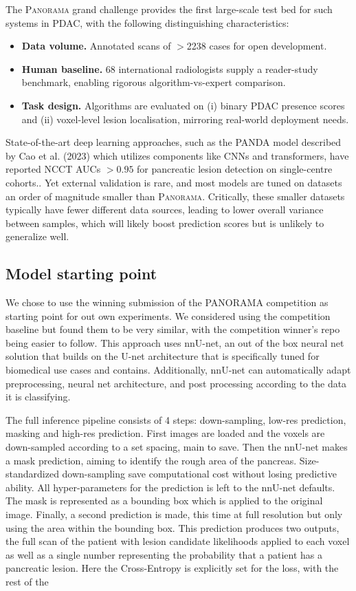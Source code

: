 \documentclass[conference]{IEEEtran}
\begin{document}
The \textsc{Panorama} grand challenge provides the first large-scale test bed for such systems in PDAC, with the following distinguishing characteristics:  
\begin{itemize}[leftmargin=*]
  \item \textbf{Data volume.} Annotated scans of $>$2238 cases for open development.
  \item \textbf{Human baseline.} 68 international radiologists supply a reader-study benchmark, enabling rigorous algorithm-vs-expert comparison.
  \item \textbf{Task design.} Algorithms are evaluated on (i) binary PDAC presence scores and (ii) voxel-level lesion localisation, mirroring real-world deployment needs.
\end{itemize}

State-of-the-art deep learning approaches, such as the PANDA model described by Cao et al. (2023) which utilizes components like CNNs and transformers, have reported NCCT AUCs $>0.95$ for pancreatic lesion detection on single-centre cohorts.\cite{b9}. Yet external validation is rare, and most models are tuned on datasets an order of magnitude smaller than \textsc{Panorama}. Critically, these smaller datasets typically have fewer different data sources, leading to lower overall variance between samples, which will likely boost prediction scores but is unlikely to generalize well.

\subsection{Model starting point}
We chose to use the winning submission of the PANORAMA competition as starting point for out own experiments. We considered using the competition baseline but found them to be very similar, with the competition winner's repo being easier to follow. This approach uses nnU-net, \cite{b1} an out of the box neural net solution that builds on the U-net architecture that is specifically tuned for biomedical use cases and contains. Additionally, nnU-net can automatically adapt preprocessing, neural net architecture, and post processing according to the data it is classifying.

The full inference pipeline consists of 4 steps: down-sampling, low-res prediction, masking and high-res prediction. First images are loaded and the voxels are down-sampled according to a set spacing, main to save. Then the nnU-net makes a mask prediction, aiming to identify the rough area of the pancreas. Size-standardized down-sampling save computational cost without losing predictive ability. All hyper-parameters for the prediction is left to the nnU-net defaults. The mask is represented as a bounding box which is applied to the original image. Finally, a second prediction is made, this time at full resolution but only using the area within the bounding box. This prediction produces two outputs, the full scan of the patient with lesion candidate likelihoods applied to each voxel as well as a single number representing the probability that a patient has a pancreatic lesion. Here the Cross-Entropy is explicitly set for the loss, with the rest of the 
\end{document}
